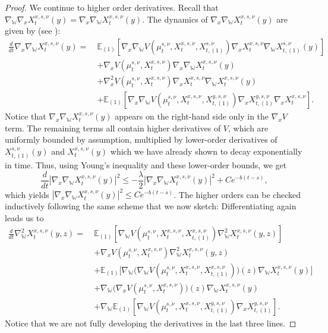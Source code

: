 \documentclass[11pt,reqno]{amsart}
\numberwithin{equation}{section}
\theoremstyle{definition}
\def\E{{\mathbb E}}
\newcommand{\wgrad}{\nabla_{\W}}
\newcommand{\W}{\mathbb W}
\begin{document}
\begin{proof}
    We continue to higher order derivatives. Recall that $\wgrad \nabla_x X_t^{x,s,\nu}(y)=\nabla_x \wgrad X_t^{x,s,\nu}(y)$. The dynamics of $\nabla_x \wgrad X_t^{x,s,\nu}(y)$ are given by (see \cite[Lemma 5.3]{Buckdahn2017-op}):
    \begin{align*}
        \frac{d}{dt}\nabla_x\wgrad X_t^{x,s,\nu}(y) =  \ &\E_{(1)}[\nabla_x\wgrad V(\mu_t^{s,\nu},X_t^{x,s,\nu}, X_{t,{(1)}}^{s,\nu}) \nabla_x X_t^{x,s,\nu}\wgrad  X_{t,(1)}^{s,\nu}(y)] \\
        &+\nabla_x V(\mu_t^{s,\nu},X_t^{x,s,\nu}) \nabla_x\wgrad  X_t^{x,s,\nu}(y) \\
        &+\nabla_x^2 V(\mu_t^{s,\nu},X_t^{x,s,\nu}) \nabla_x X_t^{x,s,\nu}\wgrad X_t^{x,s,\nu}(y) \\
        &+\E_{(1)}[\nabla_x\wgrad V(\mu_t^{s,\nu},X_t^{x,s,\nu}, X_{t,(1)}^{y,s,\nu})\nabla_x X_{t,(1)}^{y,s,\nu}\nabla_x X_t^{x,s,\nu}] .
    \end{align*}
    Notice that $\nabla_x\wgrad X_t^{x,s,\nu}(y)$ appears on the right-hand side only in the $\nabla_xV$ term. The remaining terms all contain higher derivatives of $V$, which are uniformly bounded by assumption, multiplied by lower-order derivatives of $X_{t,(1)}^{s,\nu}(y)$ and $X_t^{x,s,\nu}(y)$ which we have already shown to decay exponentially in time. Thus, using Young's inequality and these lower-order bounds, we get
    \[
    \frac{d}{dt}|\nabla_x\wgrad X_t^{x,s,\nu}(y)|^2 \le -\frac{\lambda}{2}|\nabla_x\wgrad X_t^{x,s,\nu}(y)|^2 + Ce^{-b(t-s)},
    \]
    which yields $|\nabla_x\wgrad X_t^{x,s,\nu}(y)|^2 \le Ce^{-b(t-s)}$.
    The higher orders can be checked inductively following the same scheme that we now sketch: Differentiating again leads us to 
 \begin{align*}
     \frac{d}{dt}\wgrad^2 X_t^{x,s,\nu}(y,z) = \ &\E_{(1)}[\wgrad V(\mu_t^{s,\nu},X_t^{x,s,\nu},X_{t,(1)}^{x,s,\nu}) \wgrad^2  X_t^{x,s,\nu}(y,z)] \\
     &+\nabla_x V(\mu_t^{s,\nu},X_t^{x,s,\nu}) \wgrad^2 X_t^{x,s,\nu}(y,z) \\
     &+\E_{(1)}\bigg[\wgrad\bigg(\wgrad V(\mu_t^{s,\nu},X_t^{x,s,\nu},X_{t,(1)}^{x,s,\nu})\bigg)(z) \wgrad  X_t^{x,s,\nu}(y)\bigg] \\
     &+\wgrad\bigg(\nabla_x V(\mu_t^{s,\nu},X_t^{x,s,\nu})\bigg)(z) \wgrad X_t^{x,s,\nu}(y) \\
     &+\wgrad \E_{(1)}[\wgrad V(\mu_t^{s,\nu},X_t^{x,s,\nu},X_{t,(1)}^{y,s,\nu}) \nabla_x X_{t,(1)}^{y,s,\nu}] .
 \end{align*} 
Notice that we are not fully developing the derivatives in the last three lines.

\end{proof}
\end{document}
